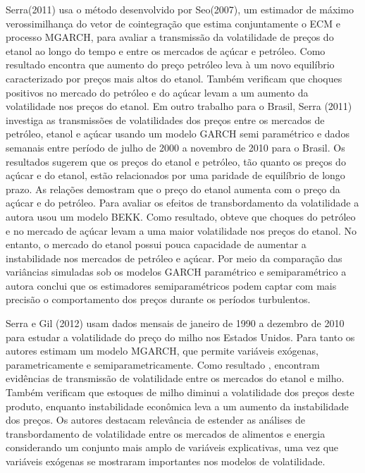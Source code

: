 \documentclass[a4paper,12pt] {article}
\begin{document}
	
	Serra(2011)  usa o método desenvolvido por Seo(2007), um estimador de máximo verossimilhança do vetor de cointegração que estima conjuntamente o ECM e 	processo MGARCH, para avaliar a transmissão da volatilidade de preços do etanol ao longo do tempo e entre os mercados de açúcar e petróleo. Como resultado encontra que aumento do preço petróleo leva à  um novo equilíbrio caracterizado por preços mais altos do etanol.  Também verificam que choques positivos no mercado do petróleo e do açúcar levam a um aumento da volatilidade nos preços do etanol.  Em outro trabalho para o Brasil, Serra (2011) investiga as transmissões de volatilidades dos preços entre os mercados de petróleo, etanol e açúcar  usando um modelo GARCH semi paramétrico e dados semanais entre período de julho de 2000 a novembro de 2010 para o Brasil. Os resultados sugerem que os preços do etanol e petróleo, tão quanto os preços do açúcar e do etanol, estão relacionados por uma paridade de equilíbrio de longo prazo. As relações demostram que o preço do etanol aumenta com o preço da açúcar e do petróleo. Para avaliar os efeitos de transbordamento da volatilidade a autora usou um modelo BEKK. Como resultado, obteve que choques do petróleo e no mercado de açúcar levam a uma maior volatilidade nos preços do etanol. No entanto, o mercado do etanol possui pouca capacidade de aumentar a instabilidade nos mercados de petróleo e açúcar. Por meio da comparação  das variâncias simuladas sob os modelos  GARCH paramétrico e semiparamétrico a autora conclui que os estimadores  semiparamétricos podem captar com mais precisão o comportamento dos preços durante os períodos turbulentos.
	
	Serra e Gil (2012) usam dados mensais de janeiro de 1990 a dezembro de 2010 para estudar a volatilidade do preço do milho nos Estados Unidos. Para tanto os autores estimam um modelo MGARCH, que permite variáveis exógenas,  parametricamente e semiparametricamente. Como resultado , encontram evidências de transmissão de volatilidade entre os mercados do etanol e milho. Também verificam que estoques de milho diminui a volatilidade dos preços deste produto, enquanto instabilidade econômica leva a um aumento da instabilidade dos preços. Os autores destacam relevância de estender as análises de transbordamento de volatilidade entre os mercados de alimentos e energia considerando um conjunto mais amplo de variáveis explicativas, uma vez que  variáveis exógenas se mostraram importantes nos modelos de volatilidade.
	
\end{document}
